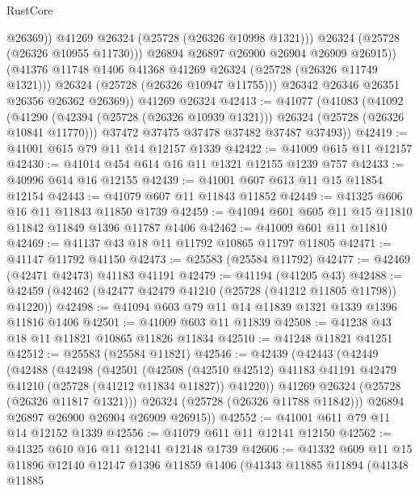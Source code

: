 \begin{lexlean}{RustCore}
\begin{coremodule}
                      @26369))
                  @41269
                  @26324
                  (@25728 (@26326 @10998 @1321)))
                @26324
                (@25728 (@26326 @10955 @11730)))
              @26894
              @26897
              @26900
              @26904
              @26909
              @26915))
          (@41376 @11748 @1406 @41368 @41269 @26324 (@25728 (@26326 @11749 @1321)))
          @26324
          (@25728 (@26326 @10947 @11755)))
        @26342
        @26346
        @26351
        @26356
        @26362
        @26369))
    @41269
    @26324
@42413 := @41077
    (@41083
      (@41092
        (@41290 (@42394 (@25728 (@26326 @10939 @1321))) @26324 (@25728 (@26326 @10841 @11770)))
        @37472
        @37475
        @37478
        @37482
        @37487
        @37493))
@42419 := @41001 @615 @79 @11 @14 @12157 @1339
@42422 := @41009 @615 @11 @12157
@42430 := @41014 @454 @614 @16 @11 @1321 @12155 @1239 @757
@42433 := @40996 @614 @16 @12155
@42439 := @41001 @607 @613 @11 @15 @11854 @12154
@42443 := @41079 @607 @11 @11843 @11852
@42449 := @41325 @606 @16 @11 @11843 @11850 @1739
@42459 := @41094 @601 @605 @11 @15 @11810 @11842 @11849 @1396 @11787 @1406
@42462 := @41009 @601 @11 @11810
@42469 := @41137 @43 @18 @11 @11792 @10865 @11797 @11805
@42471 := @41147 @11792 @41150
@42473 := @25583 (@25584 @11792)
@42477 := @42469 (@42471 @42473) @41183 @41191
@42479 := @41194 (@41205 @43)
@42488 := @42459 (@42462 (@42477 @42479 @41210 (@25728 (@41212 @11805 @11798)) @41220))
@42498 := @41094 @603 @79 @11 @14 @11839 @1321 @1339 @1396 @11816 @1406
@42501 := @41009 @603 @11 @11839
@42508 := @41238 @43 @18 @11 @11821 @10865 @11826 @11834
@42510 := @41248 @11821 @41251
@42512 := @25583 (@25584 @11821)
@42546 := @42439
    (@42443
      (@42449
        (@42488
          (@42498
            (@42501
              (@42508
                (@42510 @42512)
                @41183
                @41191
                @42479
                @41210
                (@25728 (@41212 @11834 @11827))
                @41220))
            @41269
            @26324
            (@25728 (@26326 @11817 @1321)))
          @26324
          (@25728 (@26326 @11788 @11842)))
        @26894
        @26897
        @26900
        @26904
        @26909
        @26915))
@42552 := @41001 @611 @79 @11 @14 @12152 @1339
@42556 := @41079 @611 @11 @12141 @12150
@42562 := @41325 @610 @16 @11 @12141 @12148 @1739
@42606 := @41332
    @609
    @11
    @15
    @11896
    @12140
    @12147
    @1396
    @11859
    @1406
    (@41343
      @11885
      @11894
      (@41348
        @11885

\end{coremodule}
\end{lexlean}
